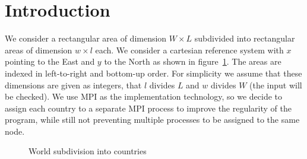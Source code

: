 \section{Introduction}
\label{sec:intro}

We consider a rectangular area of dimension $W \times L$ subdivided into rectangular areas of dimension $w \times l$ each. We consider a cartesian reference system with $x$ pointing to the East and $y$ to the North as shown in figure~\ref{fig:area_subdivision}. The areas are indexed in left-to-right and bottom-up order.
For simplicity we assume that these dimensions are given as integers, that $l$ divides $L$ and $w$ divides $W$ (the input will be checked).
We use MPI as the implementation technology, so we decide to assign each country to a separate MPI process to improve the regularity of the program, while still not preventing multiple processes to be assigned to the same node.
\begin{figure}[h]
    \centering
    \begin{subfigure}[c]{0.7\textwidth}
    \end{subfigure}
    \begin{subfigure}[c]{0.29\textwidth}
    \end{subfigure}
    \caption{World subdivision into countries}
    \label{fig:area_subdivision}
\end{figure}

